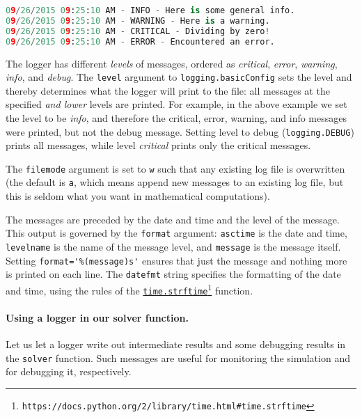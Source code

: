 \documentclass[graybox,sectrefs,envcountresetchap,open=right,final]{svmonodo}
\begin{document}
\begin{lstlisting}[language=Python,style=gray]
09/26/2015 09:25:10 AM - INFO - Here is some general info.
09/26/2015 09:25:10 AM - WARNING - Here is a warning.
09/26/2015 09:25:10 AM - CRITICAL - Dividing by zero!
09/26/2015 09:25:10 AM - ERROR - Encountered an error.

\end{lstlisting}

The logger has different \emph{levels} of messages, ordered as
\emph{critical}, \emph{error}, \emph{warning}, \emph{info}, and \emph{debug}.
The \texttt{level} argument to \texttt{logging.basicConfig} sets the level
and thereby determines what the logger will print to the file:
all messages at the specified \emph{and lower} levels are printed.
For example, in the above example we set the level to be
\emph{info}, and therefore the critical, error, warning, and info
messages were printed, but not the debug message.
Setting level to debug (\texttt{logging.DEBUG}) prints all messages,
while level \emph{critical} prints only the critical messages.

The \texttt{filemode} argument is set to \texttt{w} such that any existing
log file is overwritten (the default is \texttt{a}, which means append
new messages to an existing log file, but this is seldom what
you want in mathematical computations).

The messages are preceded by the date and time and the level of
the message. This output is governed by the \texttt{format} argument:
\texttt{asctime} is the date and time, \texttt{levelname} is the name of
the message level, and \texttt{message} is the message itself.
Setting \Verb!format='%
nothing more is printed on each line. The \texttt{datefmt} string
specifies the formatting of the date and time, using the
rules of the \href{{https://docs.python.org/2/library/time.html#time.strftime}}{\nolinkurl{time.strftime}\footnote{\texttt{https://docs.python.org/2/library/time.html\#time.strftime}}} function.

\paragraph{Using a logger in our solver function.}
Let us let a logger write out intermediate results and some debugging
results in the \texttt{solver} function. Such messages are useful for
monitoring the simulation and for debugging it, respectively.
\end{document}
